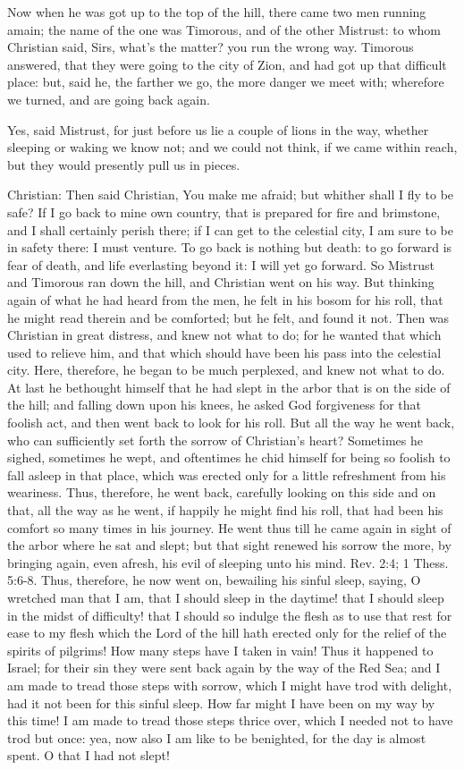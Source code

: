 Now when he was got up to the top of the hill, there came two men running amain; the name of the one was Timorous, and of the other Mistrust: to whom Christian said, Sirs, what's the matter? you run the wrong way. Timorous answered, that they were going to the city of Zion, and had got up that difficult place: but, said he, the farther we go, the more danger we meet with; wherefore we turned, and are going back again.

Yes, said Mistrust, for just before us lie a couple of lions in the way, whether sleeping or waking we know not; and we could not think, if we came within reach, but they would presently pull us in pieces.

Christian: Then said Christian, You make me afraid; but whither shall I fly to be safe? If I go back to mine own country, that is prepared for fire and brimstone, and I shall certainly perish there; if I can get to the celestial city, I am sure to be in safety there: I must venture. To go back is nothing but death: to go forward is fear of death, and life everlasting beyond it: I will yet go forward. So Mistrust and Timorous ran down the hill, and Christian went on his way. But thinking again of what he had heard from the men, he felt in his bosom for his roll, that he might read therein and be comforted; but he felt, and found it not. Then was Christian in great distress, and knew not what to do; for he wanted that which used to relieve him, and that which should have been his pass into the celestial city. Here, therefore, he began to be much perplexed, and knew not what to do. At last he bethought himself that he had slept in the arbor that is on the side of the hill; and falling down upon his knees, he asked God forgiveness for that foolish act, and then went back to look for his roll. But all the way he went back, who can sufficiently set forth the sorrow of Christian's heart? Sometimes he sighed, sometimes he wept, and oftentimes he chid himself for being so foolish to fall asleep in that place, which was erected only for a little refreshment from his weariness. Thus, therefore, he went back, carefully looking on this side and on that, all the way as he went, if happily he might find his roll, that had been his comfort so many times in his journey. He went thus till he came again in sight of the arbor where he sat and slept; but that sight renewed his sorrow the more, by bringing again, even afresh, his evil of sleeping unto his mind. Rev. 2:4; 1 Thess. 5:6-8. Thus, therefore, he now went on, bewailing his sinful sleep, saying, O wretched man that I am, that I should sleep in the daytime! that I should sleep in the midst of difficulty! that I should so indulge the flesh as to use that rest for ease to my flesh which the Lord of the hill hath erected only for the relief of the spirits of pilgrims! How many steps have I taken in vain! Thus it happened to Israel; for their sin they were sent back again by the way of the Red Sea; and I am made to tread those steps with sorrow, which I might have trod with delight, had it not been for this sinful sleep. How far might I have been on my way by this time! I am made to tread those steps thrice over, which I needed not to have trod but once: yea, now also I am like to be benighted, for the day is almost spent. O that I had not slept!

